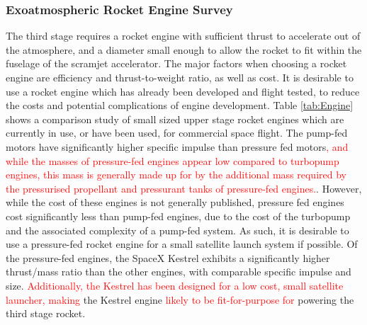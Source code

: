 		\subsubsection{Exoatmospheric Rocket Engine Survey}%
		The third stage requires a rocket engine with sufficient thrust to accelerate out of the atmosphere, and a diameter small enough to allow the rocket to fit within the fuselage of the scramjet accelerator. The major factors when choosing a rocket engine are efficiency and thrust-to-weight ratio, as well as cost. It is desirable to use a rocket engine which has already been developed and flight tested, to reduce the costs and potential complications of engine development. Table \ref{tab:Engine} shows a comparison study of small sized upper stage rocket engines which are currently in use, or have been used, for commercial space flight. The pump-fed motors have significantly higher specific impulse than pressure fed motors\textcolor{red}{, and while the masses of pressure-fed engines appear low compared to turbopump engines, this mass is generally made up for by the additional mass required by the pressurised propellant and pressurant tanks of pressure-fed engines.}. However, while the cost of these engines is not generally published, pressure fed engines cost significantly less than pump-fed engines, due to the cost of the turbopump and the associated complexity of a pump-fed system.  As such, it is desirable to use a pressure-fed rocket engine for a small satellite launch system if possible. Of the pressure-fed engines, the SpaceX Kestrel exhibits a significantly higher thrust/mass ratio than the other engines, with comparable specific impulse and size. \textcolor{red}{Additionally, the Kestrel has been designed for a low cost, small satellite launcher, making} the Kestrel engine \textcolor{red}{likely to be fit-for-purpose for} powering the third stage rocket.  
